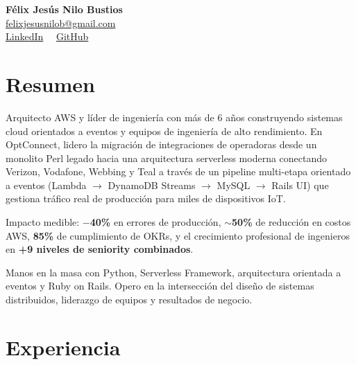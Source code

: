 \documentclass[11pt,a4paper]{article}
\begin{document}
\begin{center}
  {\LARGE\bfseries\color{accent} Félix Jesús Nilo Bustios}\\[4pt]
  {\small
    \href{mailto:felixjesusnilob@gmail.com}{felixjesusnilob@gmail.com}\\
    \href{https://www.linkedin.com/in/felix-nilo}{LinkedIn} \ \textbullet\
    \href{https://github.com/felixnilo}{GitHub}
  }
\end{center}

\section{Resumen}

Arquitecto AWS y líder de ingeniería con más de 6 años construyendo sistemas cloud orientados
a eventos y equipos de ingeniería de alto rendimiento. En OptConnect, lidero la migración de
integraciones de operadoras desde un monolito Perl legado hacia una arquitectura serverless
moderna conectando Verizon, Vodafone, Webbing y Teal a través de un pipeline multi-etapa
orientado a eventos (Lambda $\to$ DynamoDB Streams $\to$ MySQL $\to$ Rails UI) que gestiona
tráfico real de producción para miles de dispositivos IoT.

Impacto medible: \textbf{$-$40\%} en errores de producción, \textbf{$\sim$50\%} de reducción en
costos AWS, \textbf{85\%} de cumplimiento de OKRs, y el crecimiento profesional de ingenieros
en \textbf{+9 niveles de seniority combinados}.

Manos en la masa con Python, Serverless Framework, arquitectura orientada a eventos y Ruby on Rails.
Opero en la intersección del diseño de sistemas distribuidos, liderazgo de equipos y resultados de negocio.

\section{Experiencia}
\end{document}
